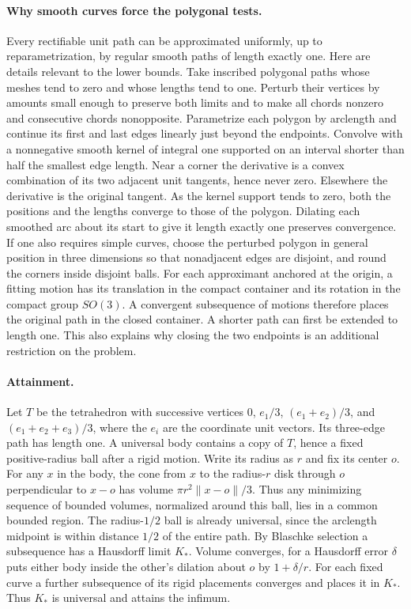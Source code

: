 \documentclass[11pt,letterpaper]{article}
\begin{document}
\paragraph{Why smooth curves force the polygonal tests.}
Every rectifiable unit path can be approximated uniformly, up to reparametrization, by regular smooth paths of length exactly one. Here are details relevant to the lower bounds. Take inscribed polygonal paths whose meshes tend to zero and whose lengths tend to one. Perturb their vertices by amounts small enough to preserve both limits and to make all chords nonzero and consecutive chords nonopposite. Parametrize each polygon by arclength and continue its first and last edges linearly just beyond the endpoints. Convolve with a nonnegative smooth kernel of integral one supported on an interval shorter than half the smallest edge length. Near a corner the derivative is a convex combination of its two adjacent unit tangents, hence never zero. Elsewhere the derivative is the original tangent. As the kernel support tends to zero, both the positions and the lengths converge to those of the polygon. Dilating each smoothed arc about its start to give it length exactly one preserves convergence. If one also requires simple curves, choose the perturbed polygon in general position in three dimensions so that nonadjacent edges are disjoint, and round the corners inside disjoint balls.
For each approximant anchored at the origin, a fitting motion has its translation in the compact container and its rotation in the compact group $SO(3)$. A convergent subsequence of motions therefore places the original path in the closed container. A shorter path can first be extended to length one. This also explains why closing the two endpoints is an additional restriction on the problem.
\paragraph{Attainment.}
Let $T$ be the tetrahedron with successive vertices $0$, $e_1/3$, $(e_1+e_2)/3$, and $(e_1+e_2+e_3)/3$, where the $e_i$ are the coordinate unit vectors. Its three-edge path has length one. A universal body contains a copy of $T$, hence a fixed positive-radius ball after a rigid motion. Write its radius as $r$ and fix its center $o$. For any $x$ in the body, the cone from $x$ to the radius-$r$ disk through $o$ perpendicular to $x-o$ has volume $\pi r^2\|x-o\|/3$. Thus any minimizing sequence of bounded volumes, normalized around this ball, lies in a common bounded region. The radius-$1/2$ ball is already universal, since the arclength midpoint is within distance $1/2$ of the entire path.
By Blaschke selection a subsequence has a Hausdorff limit $K_*$. Volume converges, for a Hausdorff error $\delta$ puts either body inside the other's dilation about $o$ by $1+\delta/r$. For each fixed curve a further subsequence of its rigid placements converges and places it in $K_*$. Thus $K_*$ is universal and attains the infimum.
\end{document}
